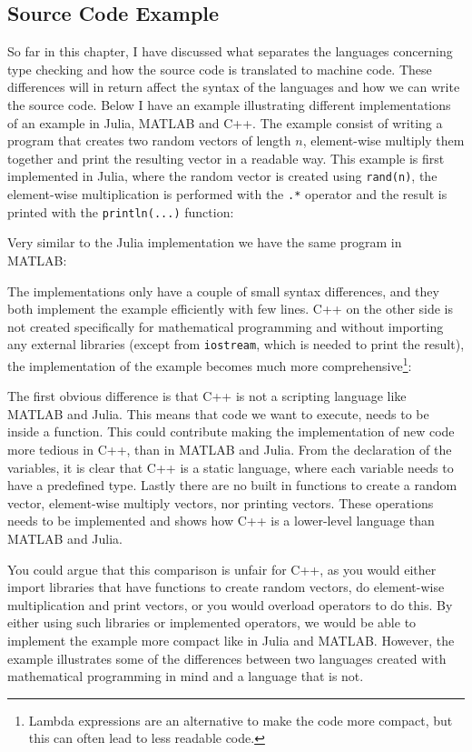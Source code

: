 \subsection{Source Code Example}
So far in this chapter, I have discussed what separates the languages concerning type checking and how the source code is translated to machine code. These differences will in return affect the syntax of the languages and how we can write the source code. Below I have an example illustrating different implementations of an example in Julia, MATLAB and C++. The example consist of writing a program that creates two random vectors of length $n$, element-wise multiply them together and print the resulting vector in a readable way. This example is first implemented in Julia, where the random vector is created using \texttt{rand(n)}, the element-wise multiplication is performed with the \texttt{.*} operator and the result is printed with the \texttt{println(...)} function:

Very similar to the Julia implementation we have the same program in MATLAB:

The implementations only have a couple of small syntax differences, and they both implement the example efficiently with few lines. C++ on the other side is not created specifically for mathematical programming and without importing any external libraries (except from \texttt{iostream}, which is needed to print the result), the implementation of the example becomes much more comprehensive\footnote{Lambda expressions are an alternative to make the code more compact, but this can often lead to less readable code.}:

The first obvious difference is that C++ is not a scripting language like MATLAB and Julia. This means that code we want to execute, needs to be inside a function. This could contribute making the implementation of new code more tedious in C++, than in MATLAB and Julia. From the declaration of the variables, it is clear that C++ is a static language, where each variable needs to have a predefined type. Lastly there are no built in functions to create a random vector, element-wise multiply vectors, nor printing vectors. These operations needs to be implemented and shows how C++ is a lower-level language than MATLAB and Julia.

You could argue that this comparison is unfair for C++, as you would either import libraries that have functions to create random vectors, do element-wise multiplication and print vectors, or you would overload operators to do this. By either using such libraries or implemented operators, we would be able to implement the example more compact like in Julia and MATLAB. However, the example illustrates some of the differences between two languages created with mathematical programming in mind and a language that is not.

